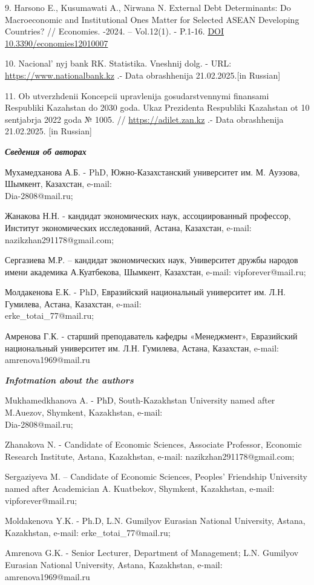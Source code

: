 \begin{references}
9. Harsono E., Kusumawati A., Nirwana N. External Debt Determinants: Do
Macroeconomic and Institut\-ional Ones Matter for Selected ASEAN
Developing Countries? // Economies. -2024. -- Vol.12(1). - P.1-16.
\href{https://doi.org/10.3390/economies12010007}{DOI
10.3390/economies12010007}

10. Nacional' nyj bank RK. Statistika. Vneshnij dolg. -
URL: \href{https://www.nationalbank.kz/ru/news/vneshniy-dolg}{https://www.nationalbank.kz}
.- Data obrash\-henija 21.02.2025.{[}in Russian{]}

11. Ob utverzhdenii Koncepcii upravlenija gosudarstvennymi finansami
Respubliki Kazahstan do 2030 goda. Ukaz Prezidenta Respubliki Kazahstan
ot 10 sentjabrja 2022 goda № 1005. //
\href{https://adilet.zan.kz/rus/docs/U2200001005}{https://adilet.zan.kz} .- Data obrashhenija
21.02.2025. {[}in Russian{]}
\end{references}

\begin{authorinfo}
\emph{{\bfseries Сведения об авторах}}

Мухамедханова А.Б. - PhD, Южно-Казахстанский университет им. М. Ауэзова,
Шымкент, Казахстан, e-mail: \\Dia-2808@mail.ru;

Жанакова Н.Н. - кандидат экономических наук, ассоциированный профессор,
Институт экономических исследований, Астана, Казахстан, e-mail:
nazikzhan291178@gmail.com;

Сергазиева М.Р. -- кандидат экономических наук, Университет дружбы
народов имени академика А.Куатбекова, Шымкент, Казахстан, e-mail:
vipforever@mail.ru;

Молдакенова Е.К. - PhD, Евразийский национальный университет им. Л.Н.
Гумилева, Астана, Казахстан, e-mail:\\
erke\_totai\_77@mail.ru;

Амренова Г.К. - старший преподаватель кафедры «Менеджмент», Евразийский
национальный университет им. Л.Н. Гумилева, Астана, Казахстан, e-mail:
amrenova1969@mail.ru

\emph{{\bfseries Infotmation about the authors}}

Mukhamedkhanova A. - PhD, South-Kazakhstan University named after
M.Auezov, Shymkent, Kazakhstan, e-mail: \\Dia-2808@mail.ru;

Zhanakova N. - Candidate of Economic Sciences, Associate Professor,
Economic Research Institute, Astana, Kazakhstan, e-mail:
nazikzhan291178@gmail.com;

Sergaziyeva M. -- Candidate of Economic Sciences,
Peoples'{} Friendship University named after Academician
A. Kuatbekov, Shymkent, Kazakhstan, e-mail: vipforever@mail.ru;

Moldakenova Y.K. - Ph.D, L.N. Gumilyov Eurasian National University,
Astana, Kazakhstan, e-mail: erke\_totai\_77@mail.ru;

Amrenova G.K. - Senior Lecturer, Department of Management; L.N. Gumilyov
Eurasian National University, Astana, Kazakh\-stan, e-mail:
amrenova1969@mail.ru
\end{authorinfo}
